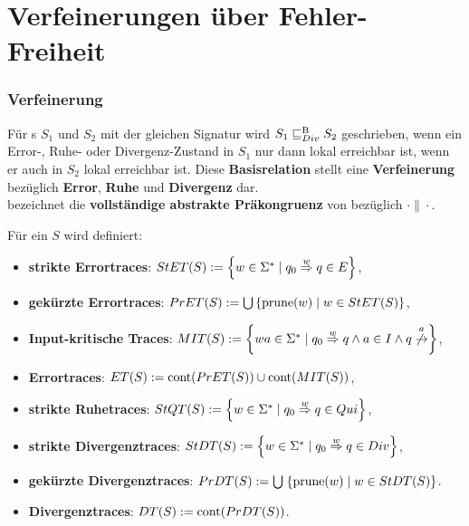 \section{Verfeinerungen über Fehler-Freiheit}
\begin{frame}
  \frametitle{Verfeinerung}
  \begin{Def}
    Für \EIO{}s $S_1$ und $S_2$ mit der gleichen Signatur wird $S_1\sqsubseteq _{Div}^\mathrm{B} S_2$
    geschrieben, wenn ein Error-, Ruhe- oder Divergenz-Zustand in $S_1$ nur
    dann lokal erreichbar ist, wenn er auch in $S_2$ lokal erreichbar ist. Diese
    \textbf{Basisrelation} stellt eine \textbf{Verfeinerung} bezüglich \textbf{Error},
    \textbf{Ruhe} und \textbf{Divergenz} dar.\\
    \DCRel{} bezeichnet die \textbf{vollständige abstrakte Präkongruenz} von \DBRel{}
    bezüglich $\cdot\|\cdot$.
  \end{Def}
\end{frame}

\begin{frame}
  \begin{Def}[Traces]
    Für ein \EIO{} $S$ wird definiert:
    \begin{itemize}
      \item \textbf{strikte Errortraces}: $StET{}(S):=\left\{w\in\Sigma
        ^*\mid q_0\overset{w}{\Rightarrow}q\in E\right\}$,
      \item \textbf{gekürzte Errortraces}: $PrET{}(S):=\bigcup\left\{\mathrm{prune}{}(w)\mid w\in
        StET{}(S)\right\}$,
      \item \textbf{Input-kritische Traces}: $\MIT{}(S):=\left\{wa\in\Sigma ^*\mid
        q_0\overset{w}{\Rightarrow}q\wedge a\in I\wedge
      q\overset{a}{\not{\hspace{-0.1cm}\rightarrow}}\right\}$,
      \item \textbf{Errortraces}: $ET{}(S):=\mathrm{cont}{}(PrET{}(S))\cup
        \mathrm{cont}{}(MIT{}(S))$,
      \item \textbf{strikte Ruhetraces}: $StQT{}(S) := \left\{w\in\Sigma ^*\mid q_0
        \overset{w}{\Rightarrow} q\in Qui\right\}$,
      \item \textbf{strikte Divergenztraces}: $StDT{}(S) := \left\{w\in\Sigma
          ^*\mid
        q_0 \overset{w}{\Rightarrow} q\in Div\right\}$,
      \item \textbf{gekürzte Divergenztraces}: $PrDT{}(S) :=
        \bigcup\hspace{1pt}\left\{\mathrm{prune}{}(w)\mid w\in StDT{}(S)\right\}$.
      \item \textbf{Divergenztraces}: $DT{}(S) :=
        \mathrm{cont}{}(PrDT{}(S))$.
    \end{itemize}
  \end{Def}
\end{frame}

